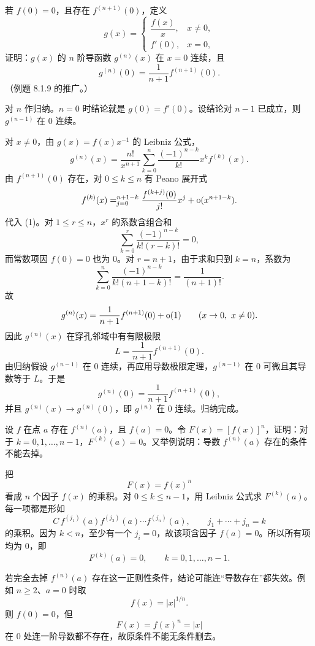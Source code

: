 \begin{xreferenceproblem}[2]
若 $f(0)=0$，且存在 $f^{(n+1)}(0)$，定义
  \[
    g(x)=
    \begin{cases}
      \dfrac{f(x)}x,&x\ne0,\\
      f'(0),&x=0,
    \end{cases}
  \]
  证明：$g(x)$ 的 $n$ 阶导函数 $g^{(n)}(x)$ 在 $x=0$ 连续，且
  \[
    g^{(n)}(0)=\frac1{n+1}f^{(n+1)}(0).
  \]
  （例题 8.1.9 的推广。）
\end{xreferenceproblem}
\begin{xsolution}
对 $n$ 作归纳。$n=0$ 时结论就是 $g(0)=f'(0)$。设结论对 $n-1$ 已成立，则 $g^{(n-1)}$ 在 $0$ 连续。

对 $x\ne0$，由 $g(x)=f(x)x^{-1}$ 的 Leibniz 公式，
\[
  g^{(n)}(x)
  =\frac{n!}{x^{n+1}}
   \sum_{k=0}^n\frac{(-1)^{n-k}}{k!}x^k f^{(k)}(x).
\tag{1}
\]
由 $f^{(n+1)}(0)$ 存在，对 $0\le k\le n$ 有 Peano 展开式
\[
  f^{(k)}(x)
  =\relax_{j=0}^{n+1-k}
    \frac{f^{(k+j)}(0)}{j!}x^j
   +\mathrm{o}(x^{n+1-k}).
\]
代入 (1)。对 $1\le r\le n$，$x^r$ 的系数含组合和
\[
  \sum_{k=0}^r\frac{(-1)^{n-k}}{k!(r-k)!}=0,
\]
而常数项因 $f(0)=0$ 也为 0。对 $r=n+1$，由于求和只到 $k=n$，系数为
\[
  \sum_{k=0}^n\frac{(-1)^{n-k}}{k!(n+1-k)!}
  =\frac1{(n+1)!}.
\]
故
\[
  g^{(n)}(x)
  =\frac1{n+1}f^{(n+1)}(0)+\mathrm{o}(1)
  \qquad(x\to0,\ x\ne0).
\]
因此 $g^{(n)}(x)$ 在穿孔邻域中有有限极限
\[
  L=\frac1{n+1}f^{(n+1)}(0).
\]
由归纳假设 $g^{(n-1)}$ 在 $0$ 连续，再应用导数极限定理，$g^{(n-1)}$ 在 $0$ 可微且其导数等于 $L$。于是
\[
  \boxed{g^{(n)}(0)=\frac1{n+1}f^{(n+1)}(0)},
\]
并且 $g^{(n)}(x)\to g^{(n)}(0)$，即 $g^{(n)}$ 在 $0$ 连续。归纳完成。
\end{xsolution}


\begin{xreferenceproblem}[3]
设 $f$ 在点 $a$ 存在 $f^{(n)}(a)$，且 $f(a)=0$。令 $F(x)=[f(x)]^n$，证明：对于 $k=0,1,\ldots,n-1$，$F^{(k)}(a)=0$。又举例说明：导数 $f^{(n)}(a)$ 存在的条件不能去掉。
\end{xreferenceproblem}
\begin{xsolution}
把
\[
  F(x)=f(x)^n
\]
看成 $n$ 个因子 $f(x)$ 的乘积。对 $0\le k\le n-1$，用 Leibniz 公式求 $F^{(k)}(a)$。每一项都是形如
\[
  C\,f^{(j_1)}(a)f^{(j_2)}(a)\cdots f^{(j_n)}(a),
  \qquad j_1+\cdots+j_n=k
\]
的乘积。因为 $k<n$，至少有一个 $j_i=0$，故该项含因子 $f(a)=0$。所以所有项均为 0，即
\[
  \boxed{F^{(k)}(a)=0,\qquad k=0,1,\ldots,n-1.}
\]

若完全去掉 $f^{(n)}(a)$ 存在这一正则性条件，结论可能连“导数存在”都失效。例如 $n\ge2$、$a=0$ 时取
\[
  f(x)=|x|^{1/n}.
\]
则 $f(0)=0$，但
\[
  F(x)=f(x)^n=|x|
\]
在 $0$ 处连一阶导数都不存在，故原条件不能无条件删去。
\end{xsolution}


